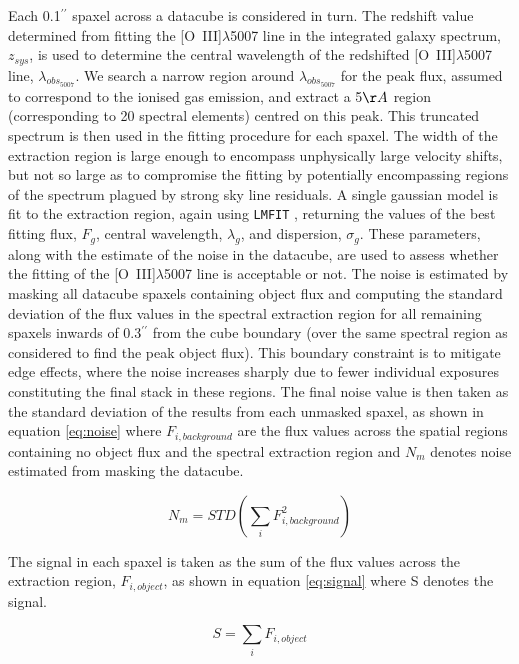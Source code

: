 \documentclass[fleqn,usenatbib]{mn2e}
\begin{document}
Each 0.1$^{\prime\prime}$ spaxel across a datacube is considered in turn.
The redshift value determined from fitting the [O~{\sc III}]$\lambda$5007 line in the integrated galaxy spectrum, $z_{sys}$, is used to determine the central wavelength of the redshifted [O~{\sc III}]$\lambda$5007 line, $\lambda_{obs_{5007}}$. 
We search a narrow region around $\lambda_{obs_{5007}}$ for the peak flux, assumed to correspond to the ionised gas emission, and extract a 5$\AA$ region (corresponding to 20 spectral elements) centred on this peak.
This truncated spectrum is then used in the fitting procedure for each spaxel.
The width of the extraction region is large enough to encompass unphysically large velocity shifts, but not so large as to compromise the fitting by potentially encompassing regions of the spectrum plagued by strong sky line residuals.
A single gaussian model is fit to the extraction region, again using {\tt LMFIT} \citep{Newville2014}, returning the values of the best fitting flux, $F_{g}$, central wavelength, $\lambda_{g}$, and dispersion, $\sigma_{g}$.
These parameters, along with the estimate of the noise in the datacube, are used to assess whether the fitting of the [O~{\sc III}]$\lambda$5007 line is acceptable or not. 
The noise is estimated by masking all datacube spaxels containing object flux and computing the standard deviation of the flux values in the spectral extraction region for all remaining spaxels inwards of 0.3$^{\prime\prime}$ from the cube boundary (over the same spectral region as considered to find the peak object flux).
This boundary constraint is to mitigate edge effects, where the noise increases sharply due to fewer individual exposures constituting the final stack in these regions.
The final noise value is then taken as the standard deviation of the results from each unmasked spaxel, as shown in equation \ref{eq:noise} where $F_{i,background}$ are the flux values across the spatial regions containing no object flux and the spectral extraction region and $N_{m}$ denotes noise estimated from masking the datacube.

\begin{equation}\label{eq:noise}
    N_{m} = STD\left(\sum_{i}F_{i,background}^{2}\right)
\end{equation}

The signal in each spaxel is taken as the sum of the flux values across the extraction region, $F_{i,object}$, as shown in equation \ref{eq:signal} where S denotes the signal.

\begin{equation}\label{eq:signal}
    S = \sum_{i}F_{i,object}
\end{equation}
\end{document}

